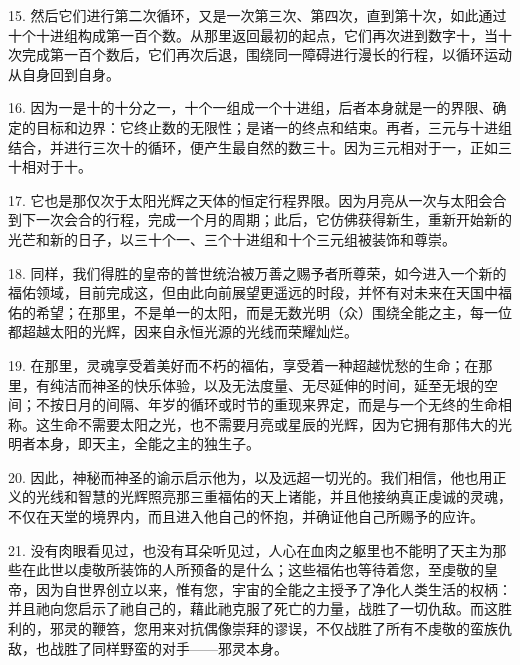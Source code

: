 15. 然后它们进行第二次循环，又是一次第三次、第四次，直到第十次，如此通过十个十进组构成第一百个数。从那里返回最初的起点，它们再次进到数字十，当十次完成第一百个数后，它们再次后退，围绕同一障碍进行漫长的行程，以循环运动从自身回到自身。\par

16. 因为一是十的十分之一，十个一组成一个十进组，后者本身就是一的界限、确定的目标和边界：它终止数的无限性；是诸一的终点和结束。再者，三元与十进组结合，并进行三次十的循环，便产生最自然的数三十。因为三元相对于一，正如三十相对于十。\par

17. 它也是那仅次于太阳光辉之天体的恒定行程界限。因为月亮从一次与太阳会合到下一次会合的行程，完成一个月的周期；此后，它仿佛获得新生，重新开始新的光芒和新的日子，以三十个一、三个十进组和十个三元组被装饰和尊崇。\par

18. 同样，我们得胜的皇帝的普世统治被万善之赐予者所尊荣，如今进入一个新的福佑领域，目前完成这，但由此向前展望更遥远的时段，并怀有对未来在天国中福佑的希望；在那里，不是单一的太阳，而是无数光明（众）围绕全能之主，每一位都超越太阳的光辉，因来自永恒光源的光线而荣耀灿烂。\par

19. 在那里，灵魂享受着美好而不朽的福佑，享受着一种超越忧愁的生命；在那里，有纯洁而神圣的快乐体验，以及无法度量、无尽延伸的时间，延至无垠的空间；不按日月的间隔、年岁的循环或时节的重现来界定，而是与一个无终的生命相称。这生命不需要太阳之光，也不需要月亮或星辰的光辉，因为它拥有那伟大的光明者本身，即天主，全能之主的独生子。\par

20. 因此，神秘而神圣的谕示启示他为，以及远超一切光的。我们相信，他也用正义的光线和智慧的光辉照亮那三重福佑的天上诸能，并且他接纳真正虔诚的灵魂，不仅在天堂的境界内，而且进入他自己的怀抱，并确证他自己所赐予的应许。\par

21. 没有肉眼看见过，也没有耳朵听见过，人心在血肉之躯里也不能明了天主为那些在此世以虔敬所装饰的人所预备的是什么；这些福佑也等待着您，至虔敬的皇帝，因为自世界创立以来，惟有您，宇宙的全能之主授予了净化人类生活的权柄：并且祂向您启示了祂自己的，藉此祂克服了死亡的力量，战胜了一切仇敌。而这胜利的，邪灵的鞭笞，您用来对抗偶像崇拜的谬误，不仅战胜了所有不虔敬的蛮族仇敌，也战胜了同样野蛮的对手——邪灵本身。\par

